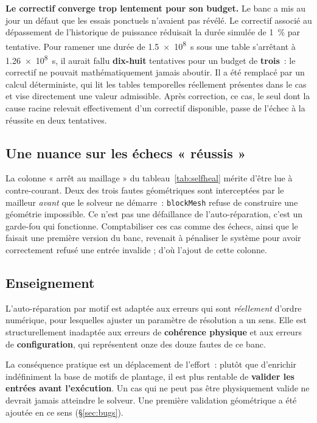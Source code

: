 \documentclass[12pt,a4paper,french]{report}
\begin{document}
\textbf{Le correctif converge trop lentement pour son budget.} Le banc a mis au
jour un défaut que les essais ponctuels n'avaient pas révélé. Le correctif
associé au dépassement de l'historique de puissance réduisait la durée simulée
de \SI{1}{\percent} par tentative. Pour ramener une durée de \SI{1.5e8}{\second}
sous une table s'arrêtant à \SI{1.26e8}{\second}, il aurait fallu
\textbf{dix-huit} tentatives pour un budget de \textbf{trois}~: le correctif ne
pouvait mathématiquement jamais aboutir. Il a été remplacé par un calcul
déterministe, qui lit les tables temporelles réellement présentes dans le cas
et vise directement une valeur admissible. Après correction, ce cas, le seul
dont la cause racine relevait effectivement d'un correctif disponible, passe
de l'échec à la réussite en deux tentatives.

\subsection{Une nuance sur les échecs « réussis »}

La colonne « arrêt au maillage » du tableau~\ref{tab:selfheal} mérite d'être
lue à contre-courant. Deux des trois fautes géométriques sont interceptées par
le mailleur \emph{avant} que le solveur ne démarre~: \texttt{blockMesh} refuse
de construire une géométrie impossible. Ce n'est pas une défaillance de
l'auto-réparation, c'est un garde-fou qui fonctionne. Comptabiliser ces cas
comme des échecs, ainsi que le faisait une première version du banc, revenait à
pénaliser le système pour avoir correctement refusé une entrée invalide ; d'où
l'ajout de cette colonne.

\subsection{Enseignement}

L'auto-réparation par motif est adaptée aux erreurs qui sont \emph{réellement}
d'ordre numérique, pour lesquelles ajuster un paramètre de résolution a un sens.
Elle est structurellement inadaptée aux erreurs de \textbf{cohérence physique}
et aux erreurs de \textbf{configuration}, qui représentent onze des douze
fautes de ce banc.

La conséquence pratique est un déplacement de l'effort~: plutôt que d'enrichir
indéfiniment la base de motifs de plantage, il est plus rentable de
\textbf{valider les entrées avant l'exécution}. Un cas qui ne peut pas être
physiquement valide ne devrait jamais atteindre le solveur. Une première
validation géométrique a été ajoutée en ce sens (§\ref{sec:bugs}).
\end{document}
